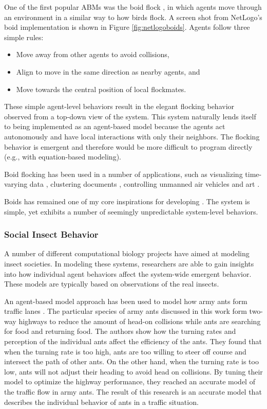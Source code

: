 One of the first popular ABMs was the boid flock \cite{reynolds1987}\cite{reynolds1999sba}, in which agents move through an environment in a similar way to how birds flock.
A screen shot from NetLogo's boid implementation \cite{flocking} is shown in Figure \ref{fig:netlogoboids}.
Agents follow three simple rules:
   \begin{itemize}
      \item Move away from other agents to avoid collisions,
      \item Align to move in the same direction as nearby agents, and
      \item Move towards the central position of local flockmates.
   \end{itemize}
These simple agent-level behaviors result in the elegant flocking behavior observed from a top-down view of the system.
This system naturally lends itself to being implemented as an agent-based model because the agents act autonomously and have local interactions with only their neighbors.
The flocking behavior is emergent and therefore would be more difficult to program directly (e.g., with equation-based modeling).

Boid flocking has been used in a number of applications, such as visualizing time-varying data \cite{1382896}, clustering documents \cite{cui2006flocking}, controlling unmanned air vehicles \cite{crowther2003flocking} and art \cite{Boyd}.

Boids has remained one of my core inspirations for developing \fw.
The system is simple, yet exhibits a number of seemingly unpredictable system-level behaviors.

\subsubsection{Social Insect Behavior}

A number of different computational biology projects have aimed at modeling insect societies.
In modeling these systems, researchers are able to gain insights into how individual agent behaviors affect the system-wide emergent behavior.
These models are typically based on observations of the real insects.

An agent-based model approach has been used to model how army ants form traffic lanes \cite{couzin2003sol}.
The particular species of army ants discussed in this work form two-way highways to reduce the amount of head-on collisions while ants are searching for food and returning food.
The authors show how the turning rates and perception of the individual ants affect the efficiency of the ants.
They found that when the turning rate is too high, ants are too willing to steer off course and intersect the path of other ants.
On the other hand, when the turning rate is too low, ants will not adjust their heading to avoid head on collisions.
By tuning their model to optimize the highway performance, they reached an accurate model of the traffic flow in army ants.
The result of this research is an accurate model that describes the individual behavior of ants in a traffic situation.

